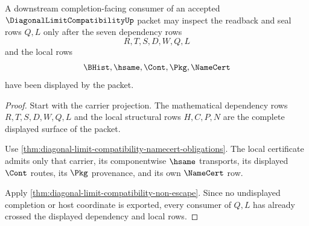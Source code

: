 \begin{theorem}
\label{thm:diagonal-limit-compatibility-consumer-threshold}
A downstream completion-facing consumer of an accepted
$\DiagonalLimitCompatibilityUp$ packet may inspect the readback and seal rows
$Q,L$ only after the seven dependency rows
$$
R,T,S,D,W,Q,L
$$
and the local rows
$$
\BHist,\hsame,\Cont,\Pkg,\NameCert
$$
have been displayed by the packet.
\end{theorem}
\begin{proof}
Start with the carrier projection. The mathematical dependency rows
$R,T,S,D,W,Q,L$ and the local structural rows $H,C,P,N$ are the complete
displayed surface of the packet.

Use \autoref{thm:diagonal-limit-compatibility-namecert-obligations}. The local
certificate admits only that carrier, its componentwise $\hsame$ transports,
its displayed $\Cont$ routes, its $\Pkg$ provenance, and its own $\NameCert$
row.

Apply \autoref{thm:diagonal-limit-compatibility-non-escape}. Since no
undisplayed completion or host coordinate is exported, every consumer of $Q,L$
has already crossed the displayed dependency and local rows.
\end{proof}


